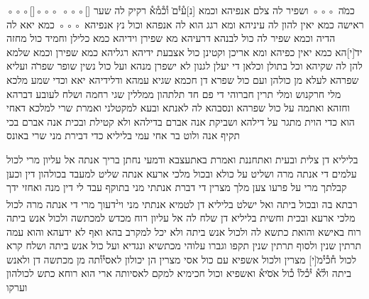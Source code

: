 \begin{aramaictext}
    ◦◦◦[\hspace{3em}]◦◦◦
    ◦◦◦[\hspace{9em}] כמ̇ה ◦◦◦ ושפיר לה צלם אנפיהא וכמא
    [נ]ע֯י֯ם̇ ו֯כ֯מ֯א֯ רקיק לה שער ראישה כמא יאין להון לה עיניהא ומא רגג הוא
    לה אנפהא וכול נץ
    אנפיהא ◦◦◦ כמא יאא לה הדיה וכמא שפיר לה כול לבנהא דרעיהא מא
    שפירן וידיהא כמא
    כלילן וחמיד כול מחזה יד̇[י]הא כמא יאין כפיהא ומא אריכן וקטינן כול
    אצבעת ידיהא רגליהא
    כמא שפירן וכמא שלמא להן לה שקיהא וכל בתולן וכלאן די יעלן לגנון
    לא ישפרן מנהא ועל כול
    נשין שופר שפר̇ה ועליא שפרהא לעלא מן כולהן ועם כול שפרא דן חכמא
    שגיא עמהא ודלידיהא
    יאא וכדי שמע מלכא מלי חרקנוש ומלי תרין חברוהי די פם חד תלתהון
    ממללין שגי רחמה ושלח
    לעובע דברהא וחזהא ואתמה על כול שפרהא ונסבהא לה לאנתא ובעא
    למקטלני ואמרת שרי
    למלכא דאחי הוא כדי הוית מתגר על דילהא ושביקת אנה אברם בדילהא
    ולא קטילת ובכית אנה
    אברם בכי תקיף אנה ולוט בר אחי עמי בליליא כדי דבירת מני שרי באונס
    \vacat
\end{aramaictext}

\begin{translation}
\end{translation}

\begin{aramaictext}
    בליליא דן צלית ובעית ואתחננת ואמרת באתעצבא ודמעי נחתן בריך אנתה
    אל עליון מרי לכול
    עלמים די אנתה מרה ושליט על כולא ובכול מלכי ארעא אנתה שליט
    למעבד בכולהון דין וכען
    קבלתך מרי על פרעו צען מלך מצרין די דברת אנתתי מני בתוקף עבד לי
    דין מנה ואחזי ידך רבתא
    בה ובכול ביתה ואל ישלט בליליא דן לטמיא אנתתי מני וי\textsuperscript{נ}דעוך מרי די
    אנתה מרה לכול מלכי
    ארעא ובכית וחשית בליליא דן שלח לה אל עליון רוח מכדש למכתשה
    ולכול אנש ביתה רוח
    באישא והואת כתשא לה ולכול אנש ביתה ולא יכל למקרב בהא ואף לא
    ידעהא והוא עמה
    תרתין שנין ולסוף תרתין שנין תקפו וגברו עלוהי מכתשיא ונגדיא ועל כול
    אנש ביתה ושלח
    קרא לכול ח֯כ֯י֯מ̇[י] מצרין ולכול אשפיא עם כול אסי מצרין הן יכולון
    לאסי֯ו֯תה מן מכתשה דן ולאנש
    ביתה ול֯א֯ י֯כ֯לו֯ כ֯ול א̇ס̇יא֯ ואשפיא וכול חכימיא למקם לאסיותה ארי הוא
    רוחא כתש לכולהון
    וערקו \vacat
\end{aramaictext}

